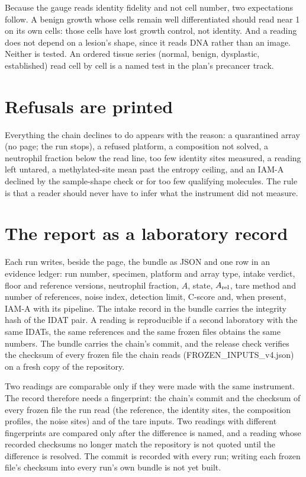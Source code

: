 Because the gauge reads identity fidelity and not cell number, two expectations follow. A benign growth whose cells remain well
differentiated should read near 1 on its own cells: those cells have lost growth control, not identity. And a reading does not depend
on a lesion's shape, since it reads DNA rather than an image. \prediction{} Neither is tested. An ordered tissue series (normal, benign, dysplastic, established) read cell by cell is a named test in the plan's precancer track. \openprob

\section{Refusals are printed}

Everything the chain declines to do appears with the reason: a quarantined array (no page; the run stops), a refused platform, a composition not solved, a
neutrophil fraction below the read line, too few identity sites measured, a reading left untared, a methylated-site mean past the entropy ceiling, and an IAM-A declined by the sample-shape check or for too few qualifying molecules. The rule is that a reader should never have to infer what the instrument did not measure.

\section{The report as a laboratory record}

Each run writes, beside the page, the bundle as JSON and one row in an evidence ledger: run number, specimen, platform and array type, intake verdict, floor and
reference versions, neutrophil fraction, $A$, state, $A_{\rm rel}$, tare method and number of references, noise index, detection limit, C-score and, when present,
IAM-A with its pipeline. The intake record in the bundle carries the integrity hash of the IDAT pair. A reading is reproducible if a second laboratory with the same
IDATs, the same references and the same frozen files obtains the same numbers. The bundle carries the chain's commit, and the release check verifies the checksum of every frozen file the chain reads (FROZEN\_INPUTS\_v4.json) on a fresh copy of the repository.

Two readings are comparable only if they were made with the same instrument. The record therefore needs a fingerprint: the chain's
commit and the checksum of every frozen file the run read (the reference, the identity sites, the composition profiles, the noise
sites) and of the tare inputs. Two readings with different fingerprints are compared only after the difference is named, and a reading whose recorded checksums no longer match the repository is not quoted until the difference is resolved. The commit is recorded with every run; writing each frozen file's checksum into every run's own bundle is not yet built. \openprob
